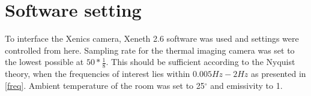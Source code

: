 \section{Software setting}

To interface the Xenics camera, Xeneth 2.6 software was used and settings were controlled from here.   
Sampling rate for the thermal imaging camera was set to the lowest possible at $50*\frac{1}{8}$. This should be sufficient according to the Nyquist theory, when the frequencies of interest lies within $0.005 Hz-2 Hz$ as presented in \cref{freq}. Ambient temperature of the room was set to 25$^{\circ}$ and emissivity to 1. 



